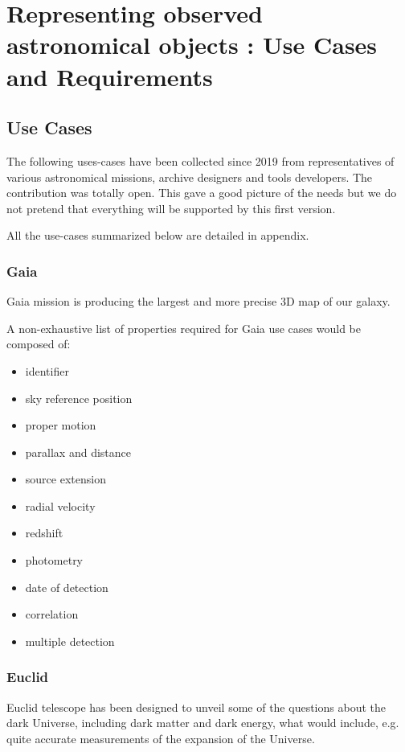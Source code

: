 \documentclass[11pt,a4paper]{ivoa}
\begin{document}
\section{Representing observed astronomical objects : Use Cases and  Requirements}

\subsection{Use Cases}
The following uses-cases have been collected since 2019 from representatives of various astronomical 
missions, archive designers and tools developers.
The contribution was totally open. This gave a good picture of the needs but we do not pretend 
that everything will be supported by this first version.

All the use-cases summarized below are detailed in appendix.

\subsubsection{Gaia}
Gaia mission is producing the largest and more precise 3D map of our galaxy.

A non-exhaustive list of properties required for Gaia use cases would be composed
of:

\begin{itemize}
    \item identifier
    \item sky reference position
    \item proper motion
    \item parallax and distance

    \item source extension
    \item radial velocity
    \item redshift
    \item photometry
    \item date of detection
    \item correlation
    \item multiple detection
\end{itemize}

\subsubsection{Euclid}
Euclid telescope has been designed to unveil some of the questions about the
dark Universe, including dark matter and dark energy, what would include, e.g.
quite accurate measurements of the expansion of the Universe.
\end{document}
